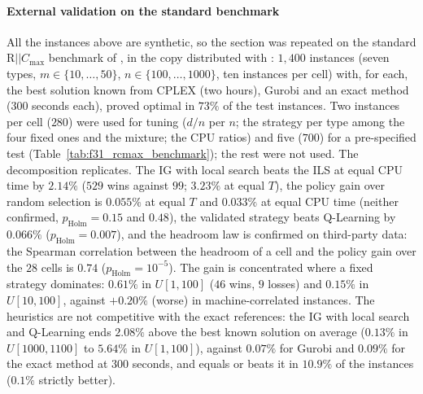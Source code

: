 \documentclass[final,3p,times,11pt,authoryear]{elsarticle}
\begin{document}


\paragraph{External validation on the standard benchmark}
All the instances above are synthetic, so the section was repeated on the standard
$\mathrm{R}||C_{\max}$ benchmark of \citet{FanjulPeyroRuiz2010}, in the copy distributed with
\citet{AbladEtAl2021}: $1{,}400$ instances (seven types, $m\in\{10,\ldots,50\}$,
$n\in\{100,\ldots,1000\}$, ten instances per cell) with, for each, the best solution known
from CPLEX (two hours), Gurobi and an exact method (300 seconds each), proved optimal in
$73\%$ of the test instances. Two instances per cell ($280$) were used for tuning ($d/n$ per $n$;
the strategy per type among the four fixed ones and the mixture; the CPU ratios) and five
($700$) for a pre-specified test (Table~\ref{tab:f31_rcmax_benchmark}); the rest were not used.
The decomposition replicates. The IG with local search beats the ILS at equal CPU time by
$2.14\%$ ($529$ wins against $99$; $3.23\%$ at equal $T$), the policy gain over random
selection is $0.055\%$ at equal $T$ and $0.033\%$ at equal CPU time (neither confirmed,
$p_{\mathrm{Holm}}=0.15$ and $0.48$), the validated strategy beats Q-Learning by $0.066\%$
($p_{\mathrm{Holm}}=0.007$), and the headroom law is confirmed on third-party data: the
Spearman correlation between the headroom of a cell and the policy gain over the $28$ cells
is $0.74$ ($p_{\mathrm{Holm}}=10^{-5}$). The gain is concentrated where a fixed strategy
dominates: $0.61\%$ in $U[1,100]$ ($46$ wins, $9$ losses) and $0.15\%$ in $U[10,100]$, against
$+0.20\%$ (worse) in machine-correlated instances. The heuristics are not competitive with the exact references: the IG with
local search and Q-Learning ends $2.08\%$ above the best known solution on average ($0.13\%$ in $U[1000,1100]$
to $5.64\%$ in $U[1,100]$), against $0.07\%$ for Gurobi and $0.09\%$ for the exact method
at 300 seconds, and equals or beats it in $10.9\%$ of the instances ($0.1\%$ strictly better).


\end{document}
